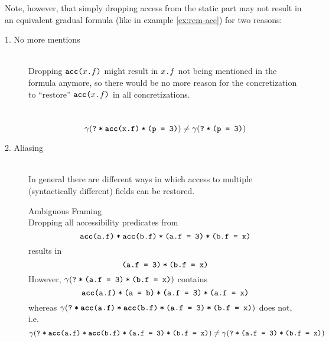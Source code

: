 \begin{proofatend}
    Note, however, that simply dropping access from the static part may not result in an equivalent gradual formula (like in example \ref{ex:rem-acc}) for two reasons:
    \begin{description}
        \item[1. No more mentions]~\\
        Dropping $\textup{\texttt{\textbf{acc}($x$.$f$)}}$ might result in $\textup{\texttt{$x$.$f$}}$ not being mentioned in the formula anymore, so there would be no more reason for the concretization to “restore” $\textup{\texttt{\textbf{acc}($x$.$f$)}}$ in all concretizations.
        \begin{example}{}\label{ex:rem-acc-1}~\\
            \begin{displaymath}
            \gamma(\textup{\texttt{\textup{\texttt{?}}\:*\:\ensuremath{\textup{\texttt{\textup{\texttt{\textbf{acc}(x.f)}}\:*\:\textup{\texttt{(p = 3)}}}}}}}) \neq \gamma(\textup{\texttt{\textup{\texttt{?}}\:*\:\ensuremath{\textup{\texttt{(p = 3)}}}}})
            \end{displaymath}
        \end{example}
        
        \item[2. Aliasing]~\\
        In general there are different ways in which access to multiple (syntactically different) fields can be restored.
        \begin{example}{Ambiguous Framing}\label{ex:rem-acc-1x}~\\
            Dropping all accessibility predicates from $$\textup{\texttt{\textup{\texttt{\textup{\texttt{\textbf{acc}(a.f)}}\:*\:\textup{\texttt{\textbf{acc}(b.f)}}}}\:*\:\textup{\texttt{\textup{\texttt{(a.f = 3)}}\:*\:\textup{\texttt{(b.f = x)}}}}}}$$
            results in
            $$\textup{\texttt{\textup{\texttt{(a.f = 3)}}\:*\:\textup{\texttt{(b.f = x)}}}}$$
            However, $\gamma(\textup{\texttt{\textup{\texttt{?}}\:*\:\ensuremath{\textup{\texttt{\textup{\texttt{(a.f = 3)}}\:*\:\textup{\texttt{(b.f = x)}}}}}}})$ contains
            $$\textup{\texttt{\textup{\texttt{\textup{\texttt{\textbf{acc}(a.f)}}\:*\:\textup{\texttt{(a = b)}}}}\:*\:\textup{\texttt{\textup{\texttt{(a.f = 3)}}\:*\:\textup{\texttt{(a.f = x)}}}}}}$$
            whereas $\gamma(\textup{\texttt{\textup{\texttt{?}}\:*\:\ensuremath{\textup{\texttt{\textup{\texttt{\textup{\texttt{\textbf{acc}(a.f)}}\:*\:\textup{\texttt{\textbf{acc}(b.f)}}}}\:*\:\textup{\texttt{\textup{\texttt{(a.f = 3)}}\:*\:\textup{\texttt{(b.f = x)}}}}}}}}})$
            does not, i.e.
            \begin{displaymath}
            \gamma(\textup{\texttt{\textup{\texttt{?}}\:*\:\ensuremath{\textup{\texttt{\textup{\texttt{\textup{\texttt{\textbf{acc}(a.f)}}\:*\:\textup{\texttt{\textbf{acc}(b.f)}}}}\:*\:\textup{\texttt{\textup{\texttt{(a.f = 3)}}\:*\:\textup{\texttt{(b.f = x)}}}}}}}}}) \neq
            \gamma(\textup{\texttt{\textup{\texttt{?}}\:*\:\ensuremath{\textup{\texttt{\textup{\texttt{(a.f = 3)}}\:*\:\textup{\texttt{(b.f = x)}}}}}}})
            \end{displaymath}
        \end{example}
    \end{description}
    

\end{proofatend}
